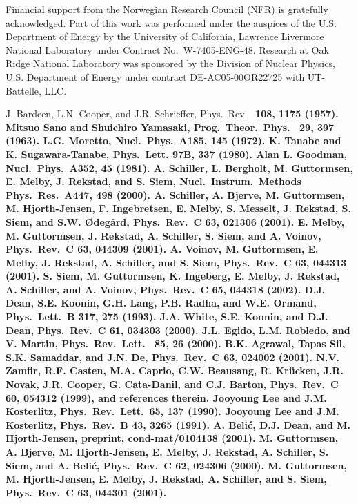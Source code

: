 \begin{multicols}{2}
\acknowledgements

Financial support from the Norwegian Research Council (NFR) is gratefully 
acknowledged. Part of this work was performed under the auspices of the U.S. 
Department of Energy by the University of California, Lawrence Livermore 
National Laboratory under Contract No.\ W-7405-ENG-48. Research at Oak Ridge 
National Laboratory was sponsored by the Division of Nuclear Physics, U.S. 
Department of Energy under contract DE-AC05-00OR22725 with UT-Battelle, LLC\@.

\begin{references}
J. Bardeen, L.N. Cooper, and J.R. Schrieffer, Phys.\ Rev.\ \bf 
108\rm, 1175 (1957).
Mitsuo Sano and Shuichiro Yamasaki, Prog.\ Theor.\ Phys.\ \bf 
29\rm, 397 (1963).
L.G. Moretto, Nucl.\ Phys.\ \bf A185\rm, 145 (1972).
K. Tanabe and K. Sugawara-Tanabe, Phys.\ Lett. \bf 97B\rm, 337 
(1980).
Alan L. Goodman, Nucl.\ Phys.\ \bf A352\rm, 45 (1981).
A. Schiller, L. Bergholt, M. Guttormsen, E. Melby, J. Rekstad, 
and S. Siem, Nucl.\ Instrum.\ Methods Phys.\ Res.\ A\bf 447\rm, 498 (2000).
A. Schiller, A. Bjerve, M. Guttormsen, M. Hjorth-Jensen, 
F. Ingebretsen, E. Melby, S. Messelt, J. Rekstad, S. Siem, and 
S.W. {\O}deg{\aa}rd, Phys.\ Rev.\ C \bf 63\rm, 021306 (2001).
E. Melby, M. Guttormsen, J. Rekstad, A. Schiller, S. Siem, and 
A. Voinov, Phys.\ Rev.\ C \bf 63\rm, 044309 (2001).
A. Voinov, M. Guttormsen, E. Melby, J. Rekstad, A. Schiller, and 
S. Siem, Phys.\ Rev.\ C \bf 63\rm, 044313 (2001).
S. Siem, M. Guttormsen, K. Ingeberg, E. Melby, J. Rekstad, 
A. Schiller, and A. Voinov, Phys.\ Rev.\ C \bf 65\rm, 044318 (2002).
D.J. Dean, S.E. Koonin, G.H. Lang, P.B. Radha, and W.E. Ormand,
Phys.\ Lett.\ B \bf 317\rm, 275 (1993).
J.A. White, S.E. Koonin, and D.J. Dean, Phys.\ Rev.\ C \bf 61\rm,
034303 (2000).
J.L. Egido, L.M. Robledo, and V. Martin, Phys.\ Rev.\ Lett.\ \bf 
85\rm, 26 (2000).
B.K. Agrawal, Tapas Sil, S.K. Samaddar, and J.N. De, Phys.\ Rev.\
C \bf 63\rm, 024002 (2001).
N.V. Zamfir, R.F. Casten, M.A. Caprio, C.W. Beausang, 
R. Kr{\"u}cken, J.R. Novak, J.R. Cooper, G. Cata-Danil, and C.J. Barton, Phys.\
Rev.\ C \bf 60\rm, 054312 (1999), and references therein.
\bibitem{LK90}Jooyoung Lee and J.M. Kosterlitz, Phys.\ Rev.\ Lett.\ \bf 65\rm, 
137 (1990).
\bibitem{LK91}Jooyoung Lee and J.M. Kosterlitz, Phys.\ Rev.\ B \bf 43\rm, 3265 
(1991).
\bibitem{BD01}A. Beli{\'c}, D.J. Dean, and M. Hjorth-Jensen, preprint, 
cond-mat/0104138 (2001).
\bibitem{GB00}M. Guttormsen, A. Bjerve, M. Hjorth-Jensen, E. Melby, J. Rekstad,
A. Schiller, S. Siem, and A. Beli{\'c}, Phys.\ Rev.\ C \bf 62\rm, 024306 
(2000).
\bibitem{GH01}M. Guttormsen, M. Hjorth-Jensen, E. Melby, J. Rekstad, 
A. Schiller, and S. Siem, Phys.\ Rev.\ C \bf 63\rm, 044301 (2001).
\end{references}
\end{multicols}


